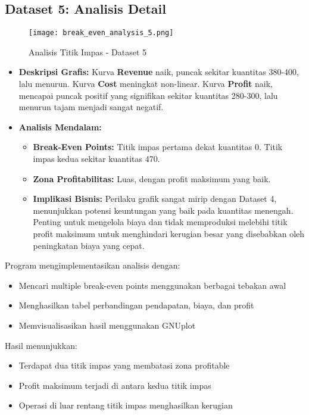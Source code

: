 \documentclass[conference]{IEEEtran}
\begin{document}
\subsection*{Dataset 5: Analisis Detail}
\begin{figure}[H]
    \centering
    \texttt{[image: break\_even\_analysis\_5.png]}
    \caption{Analisis Titik Impas - Dataset 5}
    \label{fig:dataset5_new}
\end{figure}
\begin{itemize}
    \item \textbf{Deskripsi Grafis:} Kurva \textbf{Revenue} naik, puncak sekitar kuantitas 380-400, lalu menurun. Kurva \textbf{Cost} meningkat non-linear. Kurva \textbf{Profit} naik, mencapai puncak positif yang signifikan sekitar kuantitas 280-300, lalu menurun tajam menjadi sangat negatif.
    \item \textbf{Analisis Mendalam:}
    \begin{itemize}
        \item \textbf{Break-Even Points:} Titik impas pertama dekat kuantitas 0. Titik impas kedua sekitar kuantitas 470.
        \item \textbf{Zona Profitabilitas:} Luas, dengan profit maksimum yang baik.
        \item \textbf{Implikasi Bisnis:} Perilaku grafik sangat mirip dengan Dataset 4, menunjukkan potensi keuntungan yang baik pada kuantitas menengah. Penting untuk mengelola biaya dan tidak memproduksi melebihi titik profit maksimum untuk menghindari kerugian besar yang disebabkan oleh peningkatan biaya yang cepat.
    \end{itemize}
\end{itemize}

Program mengimplementasikan analisis dengan:
\begin{itemize}
\item Mencari multiple break-even points menggunakan berbagai tebakan awal
\item Menghasilkan tabel perbandingan pendapatan, biaya, dan profit
\item Memvisualisasikan hasil menggunakan GNUplot
\end{itemize}

Hasil menunjukkan:
\begin{itemize}
\item Terdapat dua titik impas yang membatasi zona profitable
\item Profit maksimum terjadi di antara kedua titik impas
\item Operasi di luar rentang titik impas menghasilkan kerugian
\end{itemize}
\end{document}
